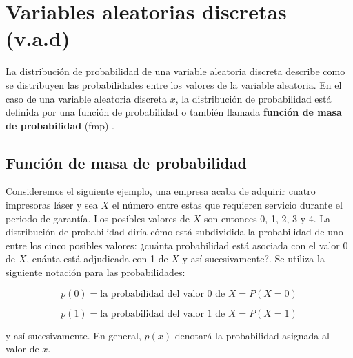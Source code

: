 \documentclass[
  11pt,
]{book}
\theoremstyle{definition}
\theoremstyle{definition}
\theoremstyle{definition}
\theoremstyle{definition}
\theoremstyle{remark}
\begin{document}
\section{Variables aleatorias discretas (v.a.d)}\label{variables-aleatorias-discretas-v.a.d}

La distribución de probabilidad de una variable aleatoria discreta describe como se distribuyen las probabilidades entre los valores de la variable aleatoria. En el caso de una variable aleatoria discreta \(x\), la distribución de probabilidad está definida por una función de probabilidad o también llamada \textbf{función de masa de probabilidad} (fmp) \citep[página 90]{Devore}.

\subsection{Función de masa de probabilidad}\label{funciuxf3n-de-masa-de-probabilidad}

Consideremos el siguiente ejemplo, una empresa acaba de adquirir cuatro impresoras láser y sea \(X\) el número entre estas que requieren servicio durante el periodo de garantía. Los posibles valores de \(X\) son entonces 0, 1, 2, 3 y 4. La distribución de probabilidad diría cómo está subdividida la probabilidad de uno entre los cinco posibles valores: ¿cuánta probabilidad está asociada con el valor 0 de \(X\), cuánta está adjudicada con 1 de \(X\) y así sucesivamente?. Se utiliza la siguiente notación para las probabilidades:

\[p(0) = \text{la probabilidad del valor 0 de } X = P(X = 0)\]

\[p(1) = \text{la probabilidad del valor 1 de } X = P(X = 1)\]

y así sucesivamente. En general, \(p(x)\) denotará la probabilidad asignada al valor de \(x\).
\end{document}
